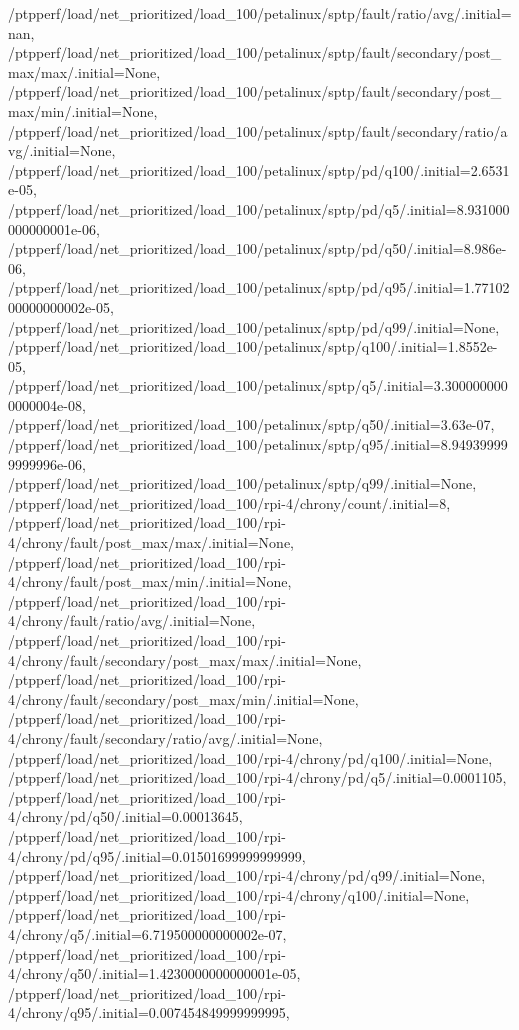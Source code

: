 {    /ptpperf/load/net_prioritized/load_100/petalinux/sptp/fault/ratio/avg/.initial=nan,
    /ptpperf/load/net_prioritized/load_100/petalinux/sptp/fault/secondary/post_max/max/.initial=None,
    /ptpperf/load/net_prioritized/load_100/petalinux/sptp/fault/secondary/post_max/min/.initial=None,
    /ptpperf/load/net_prioritized/load_100/petalinux/sptp/fault/secondary/ratio/avg/.initial=None,
    /ptpperf/load/net_prioritized/load_100/petalinux/sptp/pd/q100/.initial=2.6531e-05,
    /ptpperf/load/net_prioritized/load_100/petalinux/sptp/pd/q5/.initial=8.931000000000001e-06,
    /ptpperf/load/net_prioritized/load_100/petalinux/sptp/pd/q50/.initial=8.986e-06,
    /ptpperf/load/net_prioritized/load_100/petalinux/sptp/pd/q95/.initial=1.7710200000000002e-05,
    /ptpperf/load/net_prioritized/load_100/petalinux/sptp/pd/q99/.initial=None,
    /ptpperf/load/net_prioritized/load_100/petalinux/sptp/q100/.initial=1.8552e-05,
    /ptpperf/load/net_prioritized/load_100/petalinux/sptp/q5/.initial=3.3000000000000004e-08,
    /ptpperf/load/net_prioritized/load_100/petalinux/sptp/q50/.initial=3.63e-07,
    /ptpperf/load/net_prioritized/load_100/petalinux/sptp/q95/.initial=8.949399999999996e-06,
    /ptpperf/load/net_prioritized/load_100/petalinux/sptp/q99/.initial=None,
    /ptpperf/load/net_prioritized/load_100/rpi-4/chrony/count/.initial=8,
    /ptpperf/load/net_prioritized/load_100/rpi-4/chrony/fault/post_max/max/.initial=None,
    /ptpperf/load/net_prioritized/load_100/rpi-4/chrony/fault/post_max/min/.initial=None,
    /ptpperf/load/net_prioritized/load_100/rpi-4/chrony/fault/ratio/avg/.initial=None,
    /ptpperf/load/net_prioritized/load_100/rpi-4/chrony/fault/secondary/post_max/max/.initial=None,
    /ptpperf/load/net_prioritized/load_100/rpi-4/chrony/fault/secondary/post_max/min/.initial=None,
    /ptpperf/load/net_prioritized/load_100/rpi-4/chrony/fault/secondary/ratio/avg/.initial=None,
    /ptpperf/load/net_prioritized/load_100/rpi-4/chrony/pd/q100/.initial=None,
    /ptpperf/load/net_prioritized/load_100/rpi-4/chrony/pd/q5/.initial=0.0001105,
    /ptpperf/load/net_prioritized/load_100/rpi-4/chrony/pd/q50/.initial=0.00013645,
    /ptpperf/load/net_prioritized/load_100/rpi-4/chrony/pd/q95/.initial=0.01501699999999999,
    /ptpperf/load/net_prioritized/load_100/rpi-4/chrony/pd/q99/.initial=None,
    /ptpperf/load/net_prioritized/load_100/rpi-4/chrony/q100/.initial=None,
    /ptpperf/load/net_prioritized/load_100/rpi-4/chrony/q5/.initial=6.719500000000002e-07,
    /ptpperf/load/net_prioritized/load_100/rpi-4/chrony/q50/.initial=1.4230000000000001e-05,
    /ptpperf/load/net_prioritized/load_100/rpi-4/chrony/q95/.initial=0.007454849999999995,
}
